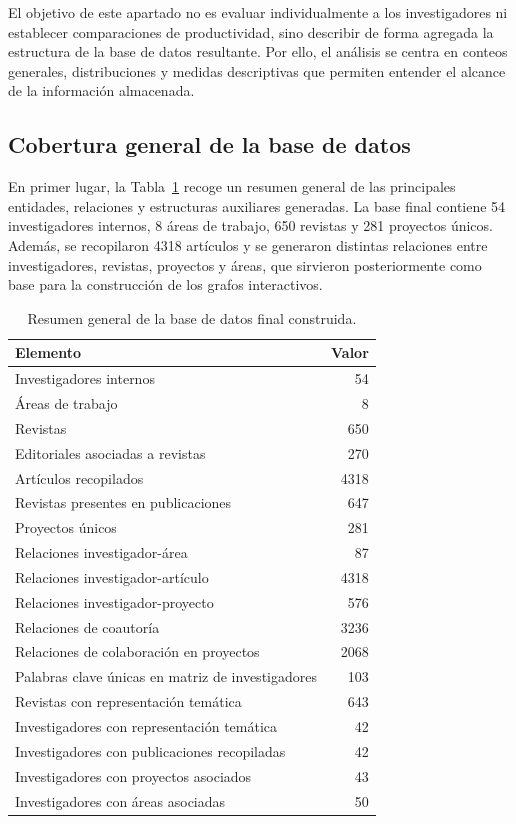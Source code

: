 \documentclass[11pt,spanish,listoffigures,listoftables]{tfgetsinf}
\begin{document}
El objetivo de este apartado no es evaluar individualmente a los investigadores ni establecer comparaciones de productividad, sino describir de forma agregada la estructura de la base de datos resultante. Por ello, el análisis se centra en conteos generales, distribuciones y medidas descriptivas que permiten entender el alcance de la información almacenada.

\subsection{Cobertura general de la base de datos}

En primer lugar, la Tabla~\ref{tab:resumen_base_datos} recoge un resumen general de las principales entidades, relaciones y estructuras auxiliares generadas. La base final contiene 54 investigadores internos, 8 áreas de trabajo, 650 revistas y 281 proyectos únicos. Además, se recopilaron 4318 artículos y se generaron distintas relaciones entre investigadores, revistas, proyectos y áreas, que sirvieron posteriormente como base para la construcción de los grafos interactivos.

\begin{table}[H]
\centering
\small
\begin{tabular}{lr}
\toprule
\textbf{Elemento} & \textbf{Valor} \\
\midrule
Investigadores internos & 54 \\
Áreas de trabajo & 8 \\
Revistas & 650 \\
Editoriales asociadas a revistas & 270 \\
Artículos recopilados & 4318 \\
Revistas presentes en publicaciones & 647 \\
Proyectos únicos & 281 \\
Relaciones investigador-área & 87 \\
Relaciones investigador-artículo & 4318 \\
Relaciones investigador-proyecto & 576 \\
Relaciones de coautoría & 3236 \\
Relaciones de colaboración en proyectos & 2068 \\
Palabras clave únicas en matriz de investigadores & 103 \\
Revistas con representación temática & 643 \\
Investigadores con representación temática & 42 \\
Investigadores con publicaciones recopiladas & 42 \\
Investigadores con proyectos asociados & 43 \\
Investigadores con áreas asociadas & 50 \\
\bottomrule
\end{tabular}
\caption{Resumen general de la base de datos final construida.}
\label{tab:resumen_base_datos}
\end{table}
\end{document}
